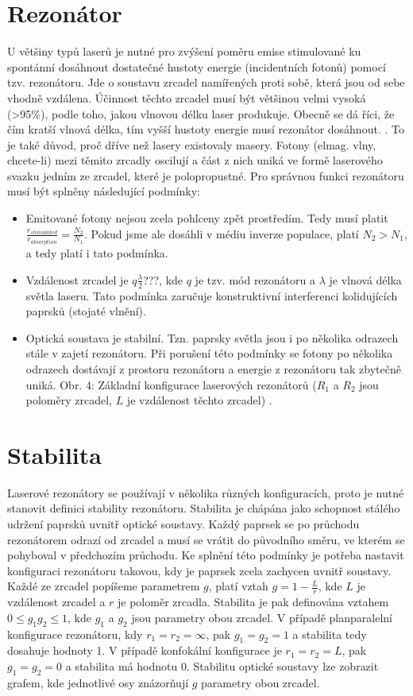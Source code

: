 \documentclass[a4paper,12pt]{article}
\begin{document}
\section{Rezonátor}
U většiny typů laserů je nutné pro zvýšení poměru emise stimulované ku spontánní dosáhnout dostatečné hustoty energie (incidentních fotonů) pomocí tzv. rezonátoru.
Jde o soustavu zrcadel namířených proti sobě, která jsou od sebe vhodně vzdálena.
Účinnost těchto zrcadel musí být většinou velmi vysoká (>95\%), podle toho, jakou vlnovou délku laser produkuje. Obecně se dá říci, že čím kratší vlnová délka, tím vyšší hustoty energie musí rezonátor dosáhnout. \cite{FundamentalsOfLightSourcesAndLasers.pdf, p. 95}. To je také důvod, proč dříve než lasery existovaly masery.
Fotony (elmag. vlny, chcete-li) mezi těmito zrcadly oscilují a část z nich uniká ve formě laserového svazku jedním ze zrcadel, které je polopropustné. Pro správnou funkci rezonátoru musí být splněny následující podmínky:
\begin{itemize}
\item Emitované fotony nejsou zcela pohlceny zpět prostředím. Tedy musí platit $\frac{r_{stimulated}}{r_{absorption}} = \frac{N_2}{N_1}$. Pokud jsme ale dosáhli v médiu inverze populace, platí $N_2>N_1$, a tedy platí i tato podmínka.
\item Vzdálenost zrcadel je $q\frac{\lambda}{2}$???, kde $q$ je tzv. mód rezonátoru a $\lambda$ je vlnová délka světla laseru. Tato podmínka zaručuje konstruktivní interferenci kolidujících paprsků (stojaté vlnění).
\item Optická soustava je stabilní. Tzn. paprsky světla jsou i po několika odrazech stále v zajetí rezonátoru. Při porušení této podmínky se fotony po několika odrazech dostávají z prostoru rezonátoru a energie z rezonátoru tak zbytečně uniká.
Obr. 4: Základní konfigurace laserových rezonátorů ($R_1$ a $R_2$ jsou poloměry zrcadel, $L$ je vzdálenost těchto zrcadel) \cite{cavity}.
\end{itemize}

\section{Stabilita}
Laserové rezonátory se používají v několika různých konfiguracích, proto je nutné stanovit definici stability rezonátoru. Stabilita je chápána jako schopnost stálého udržení paprsků uvnitř optické soustavy. Každý paprsek se po průchodu rezonátorem odrazí od zrcadel a musí se vrátit do původního směru, ve kterém se pohyboval v předchozím průchodu. Ke splnění této podmínky je potřeba nastavit konfiguraci rezonátoru takovou, kdy je paprsek zcela zachycen uvnitř soustavy. Každé ze zrcadel popíšeme parametrem $g$, platí vztah $g=1-\frac{L}{r}$, kde $L$ je vzdálenost zrcadel a $r$ je poloměr zrcadla. Stabilita je pak definována vztahem $0 \leq g_1g_2 \leq 1$, kde $g_1$ a $g_2$ jsou parametry obou zrcadel. V případě planparalelní konfigurace rezonátoru, kdy $r_1 = r_2 = \infty$, pak $g_1 = g_2 = 1$ a stabilita tedy dosahuje hodnoty 1.
V případě konfokální konfigurace je $r_1 = r_2 = L$, pak $g_1 = g_2 = 0$ a stabilita má hodnotu 0.
Stabilitu optické soustavy lze zobrazit grafem, kde jednotlivé osy znázorňují $g$ parametry obou zrcadel.
\end{document}
